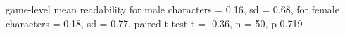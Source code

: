 game-level mean readability for male characters = 0.16, sd = 0.68, for female characters = 0.18, sd = 0.77, paired t-test t = -0.36, n = 50, p 0.719